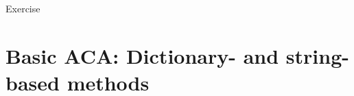 \documentclass{beamer}
\begin{document}
%	
%	
%		
%	
	



\begin{frame}[plain]
Exercise
\end{frame}





\section[Basic ACA]{Basic ACA: Dictionary- and string-based methods}
\end{document}
